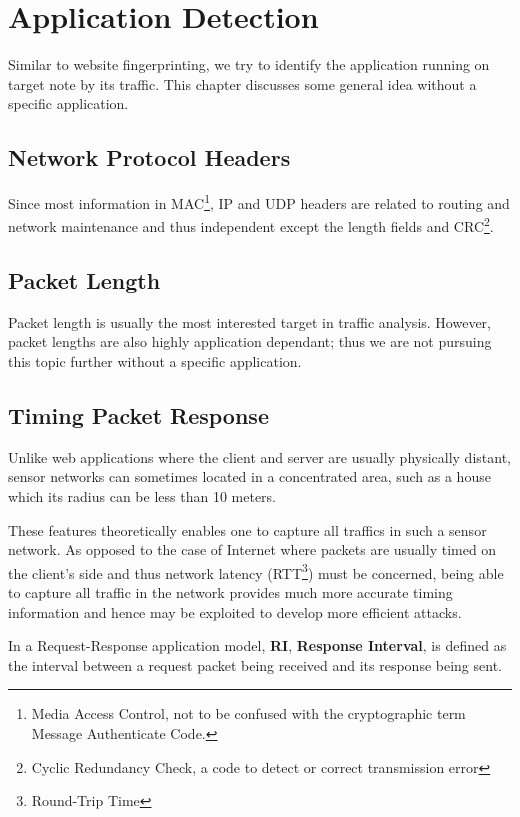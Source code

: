 \chapter{Application Detection} \label{Chp: Appdetect}
Similar to website fingerprinting, we try to identify the application running on target note by its traffic. This chapter discusses some general idea without a specific application.

\section{Network Protocol Headers}
Since most information in MAC\footnote{Media Access Control, not to be confused with the cryptographic term Message Authenticate Code.}, IP and UDP headers are related to routing and network maintenance and thus independent except the length fields and CRC\footnote{Cyclic Redundancy Check, a code to detect or correct transmission error}. 

\section{Packet Length}
Packet length is usually the most interested target in traffic analysis. However, packet lengths are also highly application dependant; thus we are not pursuing this topic further without a specific application.

\section{Timing Packet Response}
Unlike web applications where the client and server are usually physically distant, sensor networks can sometimes located in a concentrated area, such as a house which its radius can be less than 10 meters. 

These features theoretically enables one to capture all traffics in such a sensor network. As opposed to the case of Internet where packets are usually timed on the client’s side and thus network latency (RTT\footnote{Round-Trip Time}) must be concerned, being able to capture all traffic in the network provides  much more accurate timing information and hence may be exploited to develop more efficient attacks.

\begin{definition}
In a Request-Response application model, \textbf{RI}, {\bf Response Interval}, is defined as the interval between a request packet being received and its response being sent.
\end{definition}

